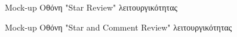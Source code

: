 \documentclass[12pt,a4paper]{article}
\begin{document}
\begin{figure}[H]
	\caption{Mock-up Οθόνη "Star Review" λειτουργικότητας}
	\label{Mock-up Οθόνη "Star Review" λειτουργικότητας}
\end{figure}

\begin{figure}[H]
	\caption{Mock-up Οθόνη "Star and Comment Review" λειτουργικότητας}
	\label{Mock-up Οθόνη "Star and Comment Review" λειτουργικότητας}
\end{figure}
\end{document}
